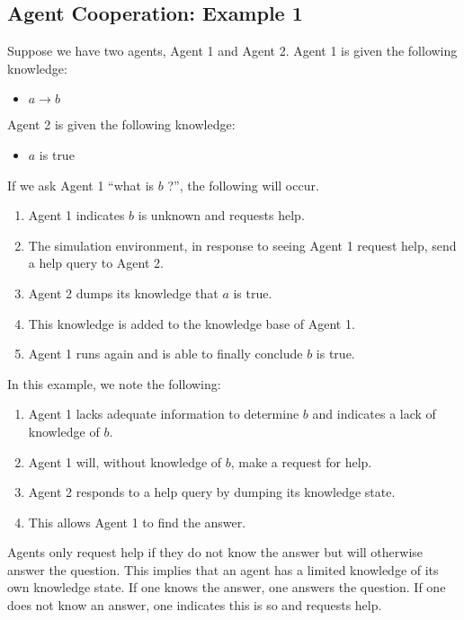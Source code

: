\documentclass{article}
\begin{document}
\subsection{Agent Cooperation: Example 1}
\label{example_1}

Suppose we have two agents, Agent 1 and Agent 2.
Agent 1 is given the following knowledge:

\begin{itemize}
\item $a \rightarrow b$
\end{itemize}

Agent 2 is given the following knowledge:

\begin{itemize}
\item $a$ is true
\end{itemize}

If we ask Agent 1 ``what is $b$ ?'', the following will occur.

\begin{enumerate}
\item Agent 1 indicates $b$ is unknown and requests help.
\item The simulation environment, in response to seeing Agent 1
request help, send a help query to Agent 2.
\item Agent 2 dumps its knowledge that $a$ is true.
\item This knowledge is added to the knowledge base of Agent 1.
\item Agent 1 runs again and is able to finally conclude $b$ is true.
\end{enumerate}

In this example, we note the following:

\begin{enumerate}
\item Agent 1 lacks adequate information to determine $b$ and
indicates a lack of knowledge of $b$.
\item Agent 1 will, without knowledge of $b$, make a request for help.
\item Agent 2 responds to a help query by dumping its knowledge state.
\item This allows Agent 1 to find the answer.
\end{enumerate}

Agents only request help if they do not know the answer but will otherwise
answer the question.  This implies that an agent has a limited knowledge of
its own knowledge state.  If one knows the answer, one answers the question.
If one does not know an answer, one indicates this is so and requests help.
\end{document}
